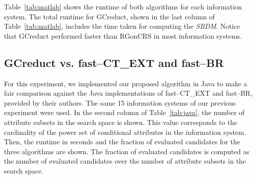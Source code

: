 \documentclass[number,preprint,review,12pt]{elsarticle}
\begin{document}
	Table~\ref{tab:matlab} shows the runtime of both algorithms for each information system. The total runtime for GCreduct, shown in the last column of Table~\ref{tab:matlab}, includes the time taken for computing the \textit{SBDM}. Notice that GCreduct performed faster than RGonCRS in most information systems.

\subsection{GCreduct vs. fast--CT\_EXT and fast--BR}\label{sub:java}
	
	For this experiment, we implemented our proposed algorithm in Java to make a fair comparison against the Java implementations of fast--CT\_EXT and fast--BR, provided by their authors. The same 15 information systems of our previous experiment were used. In the second column of Table~\ref{tab:java}, the number of attribute subsets in the search space is shown. This value corresponds to the cardinality of the power set of conditional attributes in the information system. Then, the runtime in seconds and the fraction of evaluated candidates for the three algorithms are shown. The fraction of evaluated candidates is computed as the number of evaluated candidates over the number of attribute subsets in the search space.
	
\end{document}
